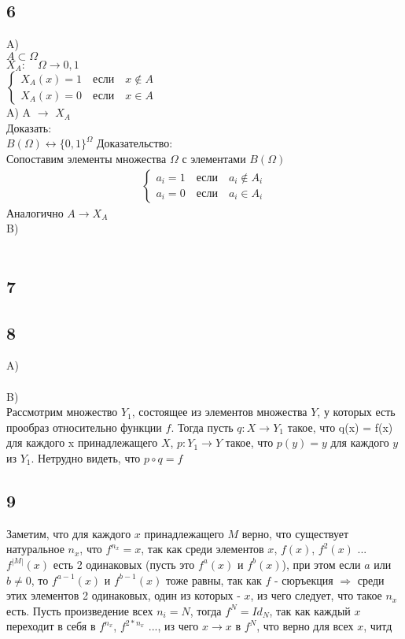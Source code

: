 		\subsection{6}
		A)\\
		$A \subset \Omega$\\
		$X_A: \quad \Omega \to {0, 1}$ \\
		$
		\begin{cases}
			X_A(x) = 1 \quad \text{если} \quad x \notin A\\
			X_A(x) = 0 \quad \text{если} \quad x \in A
		\end{cases}
		$\\
		A) A $\longrightarrow$ $X_A$\\
		Доказать:\\
		$B(\Omega) \longleftrightarrow \{ 0, 1 \}^{\Omega}$
		Доказательство:\\
		Сопоставим элементы множества $\Omega$ с элементами $B(\Omega)$\\
		\begin{gather*}
			\begin{cases}
				a_i = 1 \quad \text{если} \quad a_i \notin A_i\\
				a_i = 0 \quad \text{если} \quad a_i \in A_i
			\end{cases}
		\end{gather*}
		Аналогично $A \to X_A$
		\\
		B)\\
		\\
		\subsection{7}
	
	
		\subsection{8}
		A)\\
		\\
		B)\\
		Рассмотрим множество $Y_1$, состоящее из элементов множества $Y$, у которых есть прообраз относительно функции $f$. Тогда пусть $q: X \longrightarrow Y_1$ такое, что q(x) = f(x) для каждого x принадлежащего $X$, $p: Y_1 \longrightarrow Y$ такое, что $p(y) = y$ для каждого $y$ из $Y_1$. Нетрудно видеть, что  $p \circ q = f$
		
		\subsection{9}
		Заметим, что для каждого $x$ принадлежащего $M$ верно, что существует натуральное $n_x$, что $f^{n_x} = x$, так как среди элементов $x$, $f(x)$, $f^2(x)$ ... $f^{|M|}(x)$ есть 2 одинаковых (пусть это $f^a(x)$ и $f^b(x)$), при этом если $a$ или $b \ne 0$, то $f^{a-1}(x)$ и $f^{b-1}(x)$ тоже равны, так как $f$ - сюръекция $\Longrightarrow$ среди этих элементов 2 одинаковых, один из которых - $x$, из чего следует, что такое $n_x$ есть. Пусть произведение всех $n_i = N$, тогда $f^N = Id_N$, так как каждый $x$ переходит в себя в $f^{n_x}$, $f^{2*n_x}$ ..., из чего $x \longrightarrow x$ в $f^N$, что верно для всех $x$, читд
		
